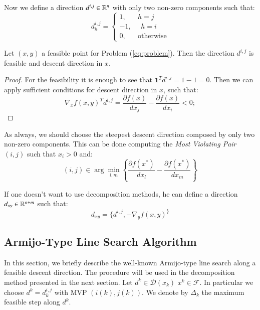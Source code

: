 Now we define a direction $d^{i,j} \in \mathbb{R}^n$ with only two non-zero components such that:
\begin{equation}\label{eq:direction}
d_h^{i,j}= 
\begin{cases}
1, \quad \text{    } h=j\\
-1, \text{    } \text{    } h=i\\
0, \quad \text{    } \text{otherwise}
\end{cases}
\end{equation}

\begin{proposition}
Let $(x,y)$ a feasible point for Problem (\ref{eq:problem}). Then the direction $d^{i,j}$ is  feasible and descent direction in $x$.
\end{proposition}
\begin{proof}
For the feasibility it is enough to see that $\mathbf{1}^Td^{i,j}=1-1=0$.
Then we can apply sufficient conditions for descent direction in $x$, such that:
\begin{equation*}
 \nabla_xf(x,y)^Td^{i,j} =  \frac{\partial f(x)}{dx_j} - \frac{\partial f(x)}{dx_i}<0; 
\end{equation*}
\end{proof}

As always, we should choose the steepest descent direction composed by only two non-zero components.
This can be done computing the \emph{Most Violating Pair} $(i,j)$ such that $x_i>0$ and:
\begin{equation}
 (i,j) \in \arg \min_{l,m} \left\{\frac{\partial f(x^*)}{dx_l} - \frac{\partial f(x^*)}{dx_m}  \right\}
\end{equation}

If one doesn't want to use decomposition methods, he can define a direction $d_{xy} \in \mathbb{R}^{n+m}$ such that:
\begin{equation}
 d_{xy}=\{d^{i,j},-\nabla_yf(x,y)^
 \}
\end{equation}

\subsection{Armijo-Type Line Search Algorithm}
In this section, we briefly describe the well-known Armijo-type line search along a feasible descent direction. The procedure will be used in the decomposition method presented in the next section. 
Let $d^{k} \in \mathcal{D}(x_k)$  $x^{k} \in \mathcal{F}$. In particular we choose $d^{k}=d^{i,j}_k$ with MVP $(i(k),j(k))$.
We denote by $\Delta_{k}$ the maximum feasible step along $d^{k}$. 

